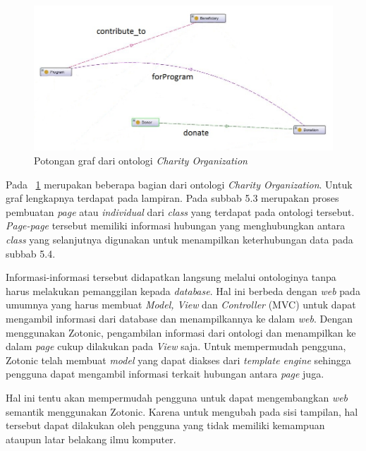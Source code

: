 \begin{figure}
	\centering
	\includegraphics[width=1\textwidth]
	{pics/ontologi.jpg}
	\caption{Potongan graf dari ontologi \textit{Charity Organization}}
	\label{fig:ontologi}
\end{figure}
\vspace{-0.3cm}

Pada \pic~\ref{fig:ontologi} merupakan beberapa bagian dari ontologi \textit{Charity Organization}. Untuk graf lengkapnya terdapat pada lampiran. Pada subbab 5.3 merupakan proses pembuatan \textit{page} atau \textit{individual} dari \textit{class} yang terdapat pada ontologi tersebut. \textit{Page-page} tersebut memiliki informasi hubungan yang menghubungkan antara \textit{class} yang selanjutnya digunakan untuk menampilkan keterhubungan data pada subbab 5.4.

Informasi-informasi tersebut didapatkan langsung melalui ontologinya tanpa harus melakukan pemanggilan kepada \textit{database}. Hal ini berbeda dengan \textit{web} pada umumnya yang harus membuat \textit{Model, View} dan \textit{Controller} (MVC) untuk dapat mengambil informasi dari database dan menampilkannya ke dalam \textit{web}. Dengan menggunakan Zotonic, pengambilan informasi dari ontologi dan menampilkan ke dalam \textit{page} cukup dilakukan pada \textit{View} saja. Untuk mempermudah pengguna, Zotonic telah membuat \textit{model} yang dapat diakses dari \textit{template engine} sehingga pengguna dapat mengambil informasi terkait hubungan antara \textit{page} juga.

Hal ini tentu akan mempermudah pengguna untuk dapat mengembangkan \textit{web} semantik menggunakan Zotonic. Karena untuk mengubah pada sisi tampilan, hal tersebut dapat dilakukan oleh pengguna yang tidak memiliki kemampuan ataupun latar belakang ilmu komputer.
